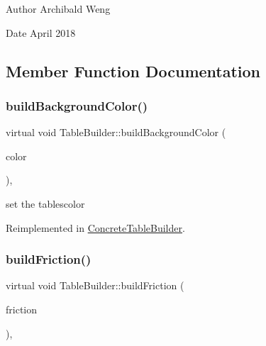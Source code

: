 \begin{DoxyAuthor}{Author}
Archibald Weng 
\end{DoxyAuthor}
\begin{DoxyDate}{Date}
April 2018 
\end{DoxyDate}


\subsection{Member Function Documentation}
\mbox{\label{class_table_builder_a43bfcc7fbc5c45c0e2fe579b7d7e5f9c}} 
\subsubsection{\texorpdfstring{build\+Background\+Color()}{buildBackgroundColor()}}
{\footnotesize\ttfamily virtual void Table\+Builder\+::build\+Background\+Color (\begin{DoxyParamCaption}\item[{Q\+String}]{color }\end{DoxyParamCaption})\hspace{0.3cm}{\ttfamily [inline]}, {\ttfamily [virtual]}}

set the table\textquotesingle{}scolor 

Reimplemented in \mbox{\hyperlink{class_concrete_table_builder_a547c26af597d109dbaf9b4de32f041a9}{Concrete\+Table\+Builder}}.

\mbox{\label{class_table_builder_a02a8d4ae71a3ef43ffd283ac10aa2e19}} 
\subsubsection{\texorpdfstring{build\+Friction()}{buildFriction()}}
{\footnotesize\ttfamily virtual void Table\+Builder\+::build\+Friction (\begin{DoxyParamCaption}\item[{double}]{friction }\end{DoxyParamCaption})\hspace{0.3cm}{\ttfamily [inline]}, {\ttfamily [virtual]}}

